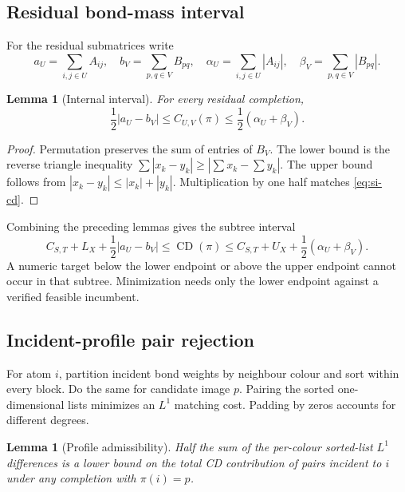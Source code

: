 \documentclass[11pt]{article}
\newtheorem{lemma}[theorem]{Lemma}
\theoremstyle{definition}
\newcommand{\CD}{\operatorname{CD}}
\begin{document}
\subsection{Residual bond-mass interval}

For the residual submatrices write
\[
 a_U=\sum_{i,j\in U}A_{ij},\quad
 b_V=\sum_{p,q\in V}B_{pq},\quad
 \alpha_U=\sum_{i,j\in U}|A_{ij}|,\quad
 \beta_V=\sum_{p,q\in V}|B_{pq}|.
\]

\begin{lemma}[Internal interval]
For every residual completion,
\begin{equation}
 \frac12|a_U-b_V|
 \leq C_{U,V}(\pi)
 \leq \frac12(\alpha_U+\beta_V).
 \label{eq:si-mass}
\end{equation}
\end{lemma}

\begin{proof}
Permutation preserves the sum of entries of \(B_V\).  The lower bound is the
reverse triangle inequality
\(
 \sum|x_k-y_k|\geq|\sum x_k-\sum y_k|
\).
The upper bound follows from
\(|x_k-y_k|\leq|x_k|+|y_k|\).  Multiplication by one half matches
\cref{eq:si-cd}.
\end{proof}

Combining the preceding lemmas gives the subtree interval
\begin{equation}
 C_{S,T}+L_X+\frac12|a_U-b_V|
 \leq \CD(\pi)\leq
 C_{S,T}+U_X+\frac12(\alpha_U+\beta_V).
 \label{eq:si-subtree}
\end{equation}
A numeric target below the lower endpoint or above the upper endpoint cannot
occur in that subtree.  Minimization needs only the lower endpoint against a
verified feasible incumbent.

\subsection{Incident-profile pair rejection}

For atom \(i\), partition incident bond weights by neighbour colour and sort
within every block.  Do the same for candidate image \(p\).  Pairing the
sorted one-dimensional lists minimizes an \(L^1\) matching cost.  Padding by
zeros accounts for different degrees.

\begin{lemma}[Profile admissibility]
Half the sum of the per-colour sorted-list \(L^1\) differences is a lower bound
on the total CD contribution of pairs incident to \(i\) under any completion
with \(\pi(i)=p\).
\end{lemma}
\end{document}
